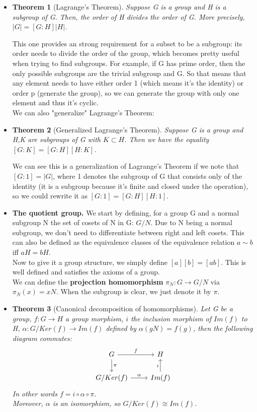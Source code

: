 \documentclass[a4paper]{article}
\newtheorem{theorem}{Theorem}[section]
\begin{document}
\begin{itemize}
\item
\begin{theorem}[Lagrange's Theorem]
Suppose G is a group and H is a subgroup of G. Then, the order of H divides the order of G. More precisely, $|G|=[G:H]|H|$.
\end{theorem}
This one provides an strong requirement for a subset to be a subgroup: its order needs to divide the order of the group, which becomes pretty useful when trying to find subgroups. For example, if G has prime order, then the only possible subgroups are the trivial subgroup and G. So that means that any element needs to have either order 1 (which means it's the identity) or order p (generate the group), so we can generate the group with only one element and thus it's cyclic.\\
We can also "generalize" Lagrange's Theorem:

\item
\begin{theorem}[Generalized Lagrange's Theorem]
Suppose G is a group and H,K are subgroups of G with $K \subset H$. Then we have the equality $[G:K]=[G:H][H:K]$.
\end{theorem}
We can see this is a generalization of Lagrange's Theorem if we note that $[G:1]=|G|$, where 1 denotes the subgroup of G that consists only of the identity (it is a subgroup because it's finite and closed under the operation), so we could rewrite it as $[G:1]=[G:H][H:1]$.

\item
\textbf{The quotient group. }We start by defining, for a group G and a normal subgroup N the set of cosets of N in G: $G/N$. Due to N being a normal subgroup, we don't need to differentiate between right and left cosets. This can also be defined as the equivalence classes of the equivalence relation $a\sim b$ iff $aH=bH$.\\
Now to give it a group structure, we simply define $[a][b] = [ab]$. This is well defined and satisfies the axioms of a group.\\
We can define the \textbf{projection homomorphism} $\pi_{N}:G\rightarrow G/N$ via $\pi_{N}(x) = xN$. When the subgroup is clear, we just denote it by $\pi$.

\item
\begin{theorem}[Canonical decomposition of homomorphisms]
Let G be a group, $f:G\rightarrow H$ a group morphism, $i$ the inclusion morphism of $Im(f)$ to H, $\alpha:G/Ker(f)\rightarrow Im(f)$ defined by $\alpha (gN)=f(g)$, then the following diagram commutes:\\
\begin{equation}
\begin{tikzcd}
G \arrow[r, "f"] \arrow[d, "\pi"] & H              \\
G/Ker(f) \arrow[r, "\alpha"]        & Im(f) \arrow[u, "i"]
\end{tikzcd}
\end{equation}
In other words $f=i \circ \alpha \circ \pi$.\\
Moreover, $\alpha$ is an isomorphism, so $G/Ker(f) \cong Im(f)$.
\end{theorem}


\end{itemize}
\end{document}
